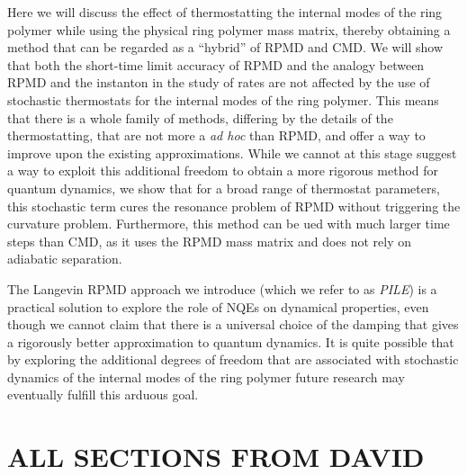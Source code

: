 \documentclass[aps,prb,superscriptaddress,amsmath,amssymb,showpacs,twocolumn]{revtex4}
\begin{document}
Here we will discuss the effect of thermostatting the internal modes of the ring
polymer while using the physical ring polymer mass matrix, thereby obtaining a method
that can be regarded as a ``hybrid'' of RPMD and CMD. We will show that both 
the short-time limit accuracy of RPMD and the analogy between RPMD and the instanton
in the study of rates are not affected by the use of stochastic thermostats for the
internal modes of the  ring polymer. This means that there is a whole family of methods,
differing by the details of the thermostatting, that are not more a \emph{ad hoc}
than RPMD, and offer a way to improve upon the existing approximations. 
While we cannot at this stage suggest a way to exploit this additional
freedom to obtain a more rigorous method for quantum dynamics, we show that
for a broad range of thermostat parameters, this stochastic term
cures the resonance problem of RPMD without triggering the curvature
problem. Furthermore, this method can be ued with much larger time steps
than CMD, as it uses the RPMD mass matrix and does not rely on adiabatic separation.

The Langevin RPMD approach we introduce (which we refer to as \textit{PILE}) is a practical solution to explore
the role of NQEs on dynamical properties, even though we cannot claim that there is 
a universal choice of the damping that gives a rigorously better approximation 
to quantum dynamics. It is quite possible that by exploring the additional 
degrees of freedom that are associated with stochastic dynamics of the 
internal modes of the ring polymer future research may eventually fulfill this 
arduous goal.

\section{ALL SECTIONS FROM DAVID \label{sec:invariance}}
\end{document}
